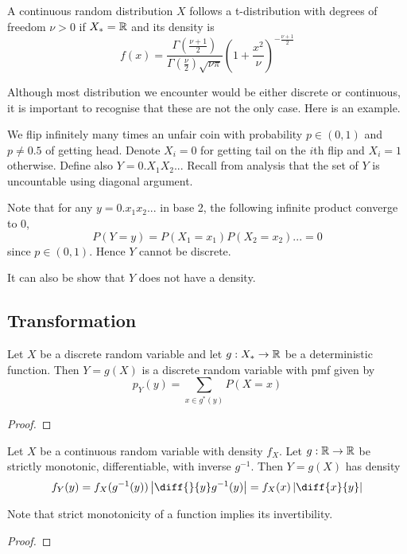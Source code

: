 \documentclass[11pt]{article}
\begin{document}
\begin{definition}[T-distribution]
  A continuous random distribution \(X\) follows a t-distribution with degrees of freedom \(\nu >0\) if \(X_*=\mathbb{R}\) and its density is
  \[f(x)=\frac{\Gamma(\frac{\nu+1}{2})}{\Gamma(\frac{\nu}{2})\sqrt{\nu\pi}}\left(1+\frac{x^2}{\nu}\right)^{-\frac{\nu+1}{2}}\]
\end{definition}

Although most distribution we encounter would be either discrete or continuous, it is important to recognise that these are not the only case. Here is an example.

\begin{example}
  We flip infinitely many times an unfair coin with probability \(p\in(0,1)\) and \(p\neq 0.5\) of getting head. Denote \(X_i=0\) for getting tail on the \(i\)th flip and \(X_i=1\) otherwise. Define also \(Y=0.X_1X_2...\) Recall from analysis that the set of \(Y\) is uncountable using diagonal argument.

  Note that for any \(y=0.x_1x_2...\) in base 2, the following infinite product converge to 0,
  \[P(Y=y)=P(X_1=x_1)P(X_2=x_2)...=0\]
  since \(p\in( 0,1)\). Hence \(Y\) cannot be discrete.

  It can also be show that \(Y\) does not have a density.%
\end{example}
\subsection{Transformation}
\begin{theorem}
  Let \(X\) be a discrete random variable and let \(g:X_*\to\mathbb{R}\) be a deterministic function. Then \(Y=g(X)\) is a discrete random variable with pmf given by
  \[p_Y(y)=\sum_{x\in g^*(y)}P(X=x)\]
\end{theorem}
\begin{proof}
\end{proof}

\begin{theorem}
  Let \(X\) be a continuous random variable with density \(f_X\). Let \(g:\mathbb{R}\to\mathbb{R}\) be strictly monotonic, differentiable, with inverse \(g^{-1}\). Then \(Y=g(X)\) has density
  \[f_Y(y)=f_X(g^{-1}(y))\left|\diff{}{y}g^{-1}(y)\right|=f_X(x)\left|\diff{x}{y}\right|\]
\end{theorem}
Note that strict monotonicity of a function implies its invertibility.
\begin{proof}
\end{proof}
\end{document}
